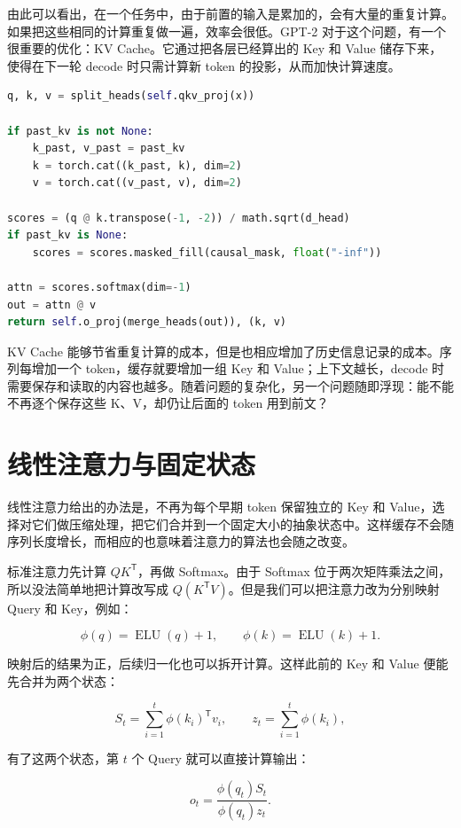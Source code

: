由此可以看出，在一个任务中，由于前置的输入是累加的，会有大量的重复计算。如果把这些相同的计算重复做一遍，效率会很低。GPT-2 对于这个问题，有一个很重要的优化：KV Cache。它通过把各层已经算出的 Key 和 Value 储存下来，使得在下一轮 decode 时只需计算新 token 的投影，从而加快计算速度。

\begin{lstlisting}[language=Python,caption={带 KV Cache 的 Softmax 注意力核心}]
q, k, v = split_heads(self.qkv_proj(x))

if past_kv is not None:
    k_past, v_past = past_kv
    k = torch.cat((k_past, k), dim=2)
    v = torch.cat((v_past, v), dim=2)

scores = (q @ k.transpose(-1, -2)) / math.sqrt(d_head)
if past_kv is None:
    scores = scores.masked_fill(causal_mask, float("-inf"))

attn = scores.softmax(dim=-1)
out = attn @ v
return self.o_proj(merge_heads(out)), (k, v)
\end{lstlisting}

KV Cache 能够节省重复计算的成本，但是也相应增加了历史信息记录的成本。序列每增加一个 token，缓存就要增加一组 Key 和 Value；上下文越长，decode 时需要保存和读取的内容也越多。随着问题的复杂化，另一个问题随即浮现：能不能不再逐个保存这些 K、V，却仍让后面的 token 用到前文？

\section{线性注意力与固定状态}

线性注意力给出的办法是，不再为每个早期 token 保留独立的 Key 和 Value，选择对它们做压缩处理，把它们合并到一个固定大小的抽象状态中。这样缓存不会随序列长度增长，而相应的也意味着注意力的算法也会随之改变。\cite{linear-transformer}

标准注意力先计算 $QK^{\mathsf T}$，再做 Softmax。由于 Softmax 位于两次矩阵乘法之间，所以没法简单地把计算改写成 $Q(K^{\mathsf T}V)$。但是我们可以把注意力改为分别映射 Query 和 Key，例如：

\[
\phi(q)=\operatorname{ELU}(q)+1,\qquad
\phi(k)=\operatorname{ELU}(k)+1.
\]

映射后的结果为正，后续归一化也可以拆开计算。这样此前的 Key 和 Value 便能先合并为两个状态：

\[
S_t=\sum_{i=1}^{t}\phi(k_i)^{\mathsf T}v_i,
\qquad
z_t=\sum_{i=1}^{t}\phi(k_i),
\]

有了这两个状态，第 $t$ 个 Query 就可以直接计算输出：

\[
o_t=
\frac{\phi(q_t)S_t}
     {\phi(q_t)z_t}.
\]

